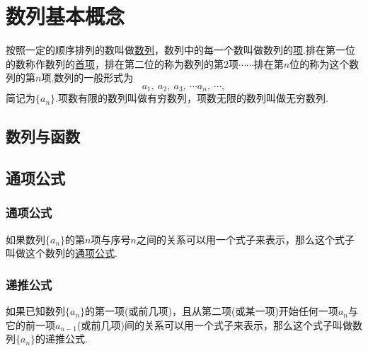 \documentclass{BHCexam}
\begin{document}
\setcounter{tocdepth}{2}
\fubiaoti{}
\maketitle
\tableofcontents
\newpage 
\section{数列基本概念}
按照一定的顺序排列的数叫做\underline{数列}，数列中的每一个数叫做数列的\underline{项}.排在第一位的数称作数列的\underline{首项}，排在第二位的称为数列的第$ 2 $项$ \cdots\cdots $排在第$ n $位的称为这个数列的第$ n $项.数列的一般形式为\[a_1,~a_2,~a_3,~\cdots a_n,~\cdots, \]简记为$ \{a_n\} $.项数有限的数列叫做有穷数列，项数无限的数列叫做无穷数列.
\subsection{数列与函数}
\subsection{通项公式}
\subsubsection{通项公式}
如果数列$\{a_n\}$的第$ n $项与序号$ n $之间的关系可以用一个式子来表示，那么这个式子叫做这个数列的\underline{通项公式}. 
\subsubsection{递推公式}
如果已知数列$\{a_n\}$的第一项(或前几项)，且从第二项(或某一项)开始任何一项$ a_n $与它的前一项$ a_{n-1} $(或前几项)间的关系可以用一个式子来表示，那么这个式子叫做数列$\{a_n\}$的递推公式.
\end{document}
